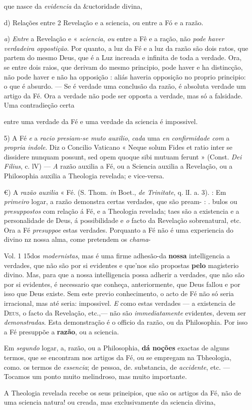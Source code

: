 que nasce da \emph{evidencia} da \&uctoridade divina,\par d) Relações entre 2 Revelação e a sciencia, ou entre a Fó e a razão.\par \emph{a}) \emph{Entre} a Revelação e « \emph{sciencia}, \emph{ou} entre a Fê e a ração, não \emph{pode haver verdadeira oppostição}. Por quanto, a luz da Fé e a luz da razão são dois ratos, que partem do mesmo Deus, que é a Luz increada e infinita de toda a verdade. Ora, se entre dois raios, que derivam do mesmo principio, pode haver e ha distincção, não pode haver e não ha opposição : aliás haveria opposição no proprio principio: o que é absurdo. --- Se é verdade uma conclusão da razão, é absoluta verdade um artigo da Fé. Ora a verdade não pode ser opposta a verdade, mas só a falsidade. Uma contradieção certa\par entre uma verdade da Fé e uma verdade da sciencia é impossivel.\par 5) A Fé \emph{e} a \emph{racio presiam-se muto auxilio}, \emph{cada} uma \emph{en confirmidade com} a \emph{propria indole}. Diz o Concilio Vaticano « Neque solum Fides et ratio inter se dissidere nunquam possunt, sed opem quoque sibi mutuam ferunt » (Const. \emph{Dei Filius}, c. lV) --- \emph{A} razão auxilia a Fé, ou a Sciencia auxilia a Revelação, ou a Philosophia auxilia a Theologia revelada; e vice-versa.\par €) A \emph{razão auxilia} « Fé. (S. Thom. \emph{in} Boet., \emph{de Trinitate}, q. lI. a. 3). : Em \emph{primeiro} logar, a razão demonstra certas verdades, que são pream- : . bulos ou \emph{presuppostos} com relação á Fé, e a Theologia revelada; taes são a existencia e a personalidade de Deus, á possibilidade e \emph{o} facto da Revelação sobrenatural, etc. Ora a Fé \emph{presuppoe} estas verdades. Porquanto a Fé não é uma experiencia do divino nz nossa alma, come pretendem os \emph{chama}-\par Vol. 1 15dos \emph{modernistas}, mas é uma firme adhesão-da \textbf{nossa} intelligencia a verdades, que não são por si evidentes e que'nos são propostas \textbf{pelo} magisterio divino. Mas, para que a nossa intelligencia possa adherir a verdades, que não são por si evidentes, é necessario que conheça, anteriormente, que Deus fallou e por isso que Deus existe. Sem este previo conhecimento, o acto de Fé não só seria irracional, mas até seria: impossivel. \emph{E} como estas verdades --- a existencia de \textsc{Deus}, o facto da Revelação, etc.,--- não são \emph{immediatamente} evidentes, devem ser \emph{demonstradas}. Esta demonstração é o officio da razão, ou da Philosophia. Por isso a Fé presuppõe a \textbf{razão}, ou a sciencia.\par Em \emph{segundo} logar, a, razão, ou a Philosophia, \textbf{dá noções} exactas de alguns termos, que se encontram nos artigos da Fé, ou se empregam na Tbheologia, como. os termos de \emph{essencia}; de pessoa, de. substancia, de \emph{accidente}, etc. --- Tocamos um ponto muito melindroso, mas muito importante.\par A Theologia revelada recebe os seus prineipios, que são os artigos da Fé, não de uma sciencia natura! ou creada, mas exclusivamente da sciencia divina, 